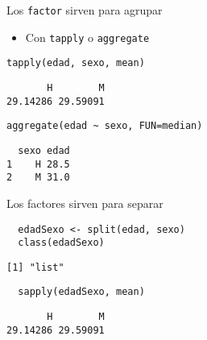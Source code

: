 \documentclass[xcolor={usenames,svgnames,dvipsnames}]{beamer}
\begin{document}
\begin{frame}[fragile,label=sec-1-4]{Los \texttt{factor} sirven para agrupar}
 \begin{itemize}
\item Con \texttt{tapply} o \texttt{aggregate}
\end{itemize}
\lstset{language=R,label= ,caption= ,numbers=none}
\begin{lstlisting}
tapply(edad, sexo, mean)
\end{lstlisting}

\begin{verbatim}
       H        M 
29.14286 29.59091
\end{verbatim}

\lstset{language=R,label= ,caption= ,numbers=none}
\begin{lstlisting}
aggregate(edad ~ sexo, FUN=median)
\end{lstlisting}

\begin{verbatim}
  sexo edad
1    H 28.5
2    M 31.0
\end{verbatim}
\end{frame}

\begin{frame}[fragile,label=sec-1-5]{Los factores sirven para separar}
 \lstset{language=R,label= ,caption= ,numbers=none}
\begin{lstlisting}
  edadSexo <- split(edad, sexo)
  class(edadSexo)
\end{lstlisting}

\begin{verbatim}
[1] "list"
\end{verbatim}

\lstset{language=R,label= ,caption= ,numbers=none}
\begin{lstlisting}
  sapply(edadSexo, mean)
\end{lstlisting}

\begin{verbatim}
       H        M 
29.14286 29.59091
\end{verbatim}
\end{frame}
\end{document}
